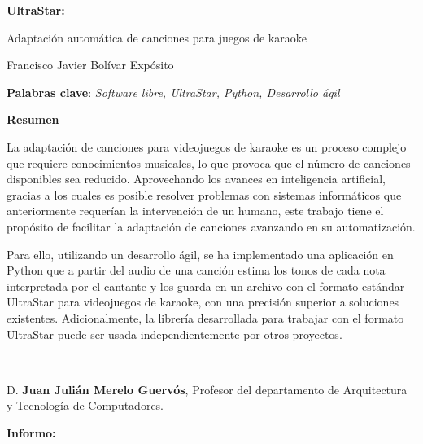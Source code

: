 \thispagestyle{empty}

\begin{center}
\large\bfseries
UltraStar: \texttt{}

Adaptación automática de canciones para juegos de karaoke
\end{center}

\begin{center}
Francisco Javier Bolívar Expósito
\end{center}


\vspace{0.5cm}
\noindent\textbf{Palabras clave}: \textit{Software libre, UltraStar, Python, Desarrollo ágil}
\vspace{0.7cm}

\noindent\textbf{Resumen}

La adaptación de canciones para videojuegos de karaoke es un proceso complejo que requiere conocimientos musicales, lo que provoca que el número de canciones disponibles sea reducido. Aprovechando los avances en inteligencia artificial, gracias a los cuales es posible resolver problemas con sistemas informáticos que anteriormente requerían la intervención de un humano, este trabajo tiene el propósito de facilitar la adaptación de canciones avanzando en su automatización.

Para ello, utilizando un desarrollo ágil, se ha implementado una aplicación en Python que a partir del audio de una canción estima los tonos de cada nota interpretada por el cantante y los guarda en un archivo con el formato estándar UltraStar para videojuegos de karaoke, con una precisión superior a soluciones existentes. Adicionalmente, la librería desarrollada para trabajar con el formato UltraStar puede ser usada independientemente por otros proyectos.


\cleardoublepage



\cleardoublepage

\thispagestyle{empty}

\noindent\rule[-1ex]{\textwidth}{2pt}\\[4.5ex]

D. \textbf{Juan Julián Merelo Guervós}, Profesor del departamento de Arquitectura y Tecnología de Computadores.

\vspace{0.5cm}

\textbf{Informo:}

\vspace{0.5cm}

